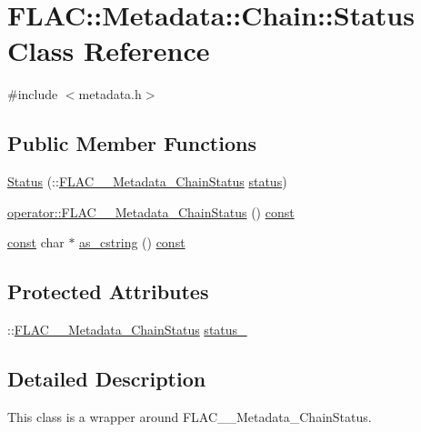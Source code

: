 \hypertarget{class_f_l_a_c_1_1_metadata_1_1_chain_1_1_status}{}\section{F\+L\+AC\+:\+:Metadata\+:\+:Chain\+:\+:Status Class Reference}
\label{class_f_l_a_c_1_1_metadata_1_1_chain_1_1_status}


{\ttfamily \#include $<$metadata.\+h$>$}

\subsection*{Public Member Functions}
\begin{DoxyCompactItemize}
\item 
\hyperlink{class_f_l_a_c_1_1_metadata_1_1_chain_1_1_status_a729a1cd46a7156075086b07ac9c3d6a3}{Status} (\+::\hyperlink{group__flac__metadata__level2_gafe2a924893b0800b020bea8160fd4531}{F\+L\+A\+C\+\_\+\+\_\+\+Metadata\+\_\+\+Chain\+Status} \hyperlink{class_f_l_a_c_1_1_metadata_1_1_chain_ab35ee440a4730e95fa81e1e142deff93}{status})
\item 
\hyperlink{class_f_l_a_c_1_1_metadata_1_1_chain_1_1_status_ab53a8083a4a01785d05355bed2954e37}{operator\+::\+F\+L\+A\+C\+\_\+\+\_\+\+Metadata\+\_\+\+Chain\+Status} () \hyperlink{getopt1_8c_a2c212835823e3c54a8ab6d95c652660e}{const} 
\item 
\hyperlink{getopt1_8c_a2c212835823e3c54a8ab6d95c652660e}{const} char $\ast$ \hyperlink{class_f_l_a_c_1_1_metadata_1_1_chain_1_1_status_ad190f4c87c9de5a5b66aa3d850620e58}{as\+\_\+cstring} () \hyperlink{getopt1_8c_a2c212835823e3c54a8ab6d95c652660e}{const} 
\end{DoxyCompactItemize}
\subsection*{Protected Attributes}
\begin{DoxyCompactItemize}
\item 
\+::\hyperlink{group__flac__metadata__level2_gafe2a924893b0800b020bea8160fd4531}{F\+L\+A\+C\+\_\+\+\_\+\+Metadata\+\_\+\+Chain\+Status} \hyperlink{class_f_l_a_c_1_1_metadata_1_1_chain_1_1_status_a88aac6c539a65dee558eab8a590ea829}{status\+\_\+}
\end{DoxyCompactItemize}


\subsection{Detailed Description}
This class is a wrapper around F\+L\+A\+C\+\_\+\+\_\+\+Metadata\+\_\+\+Chain\+Status. 

